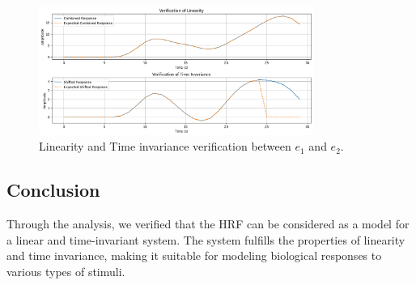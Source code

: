 \documentclass[10pt]{article}
\theoremstyle{definition}
\theoremstyle{remark}
\theoremstyle{definition}
\numberwithin{equation}{prob}
\begin{document}
\begin{figure}[H]
    \centering
    \includegraphics[width=0.8\textwidth]{./figures/Response Verification Inputs e1 and e2.png}
    \caption{Linearity and Time invariance verification between $e_1$ and $e_2$.}
\end{figure}


\subsection*{Conclusion}
Through the analysis, we verified that the HRF can be considered as a model for a linear and time-invariant system. The system fulfills the properties of linearity and time invariance, making it suitable for modeling biological responses to various types of stimuli.
\end{document}
